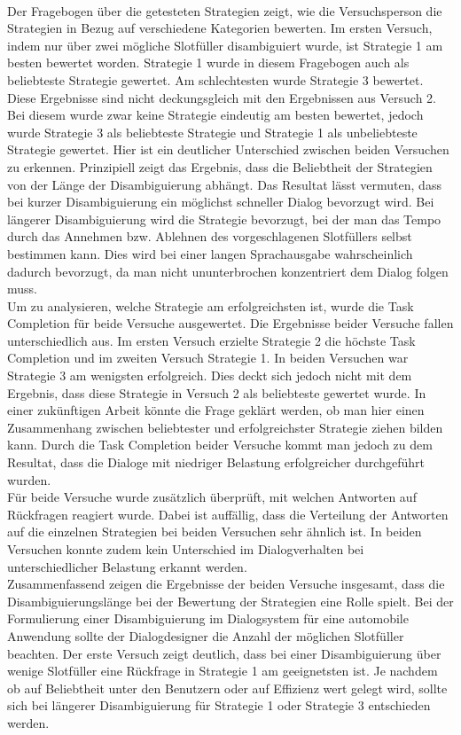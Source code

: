 \documentclass[12pt,a4paper]{scrartcl}
\begin{document}
\\
Der Fragebogen über die getesteten Strategien zeigt, wie die Versuchsperson die Strategien in Bezug auf verschiedene Kategorien bewerten. Im ersten Versuch, indem nur über zwei mögliche Slotfüller disambiguiert wurde, ist Strategie 1 am besten bewertet worden. Strategie 1 wurde in diesem Fragebogen auch als beliebteste Strategie gewertet. Am schlechtesten wurde Strategie 3 bewertet. Diese Ergebnisse sind nicht deckungsgleich mit den Ergebnissen aus Versuch 2. Bei diesem wurde zwar keine Strategie eindeutig am besten bewertet, jedoch wurde Strategie 3 als beliebteste Strategie und Strategie 1 als unbeliebteste Strategie gewertet. Hier ist ein deutlicher Unterschied zwischen beiden Versuchen zu erkennen. Prinzipiell zeigt das Ergebnis, dass die Beliebtheit der Strategien von der Länge der Disambiguierung abhängt. Das Resultat lässt vermuten, dass bei kurzer Disambiguierung ein möglichst schneller Dialog bevorzugt wird. Bei längerer Disambiguierung wird die Strategie bevorzugt, bei der man das Tempo durch das Annehmen bzw. Ablehnen des vorgeschlagenen Slotfüllers selbst bestimmen kann. Dies wird bei einer langen Sprachausgabe wahrscheinlich dadurch bevorzugt, da man nicht ununterbrochen konzentriert dem Dialog folgen muss. \\
\newline
Um zu analysieren, welche Strategie am erfolgreichsten ist, wurde die Task Completion für beide Versuche ausgewertet. Die Ergebnisse beider Versuche fallen unterschiedlich aus. Im ersten Versuch erzielte Strategie 2 die höchste Task Completion und im zweiten Versuch Strategie 1. In beiden Versuchen war Strategie 3 am wenigsten erfolgreich. Dies deckt sich jedoch nicht mit dem Ergebnis, dass diese Strategie in Versuch 2 als beliebteste gewertet wurde. In einer zukünftigen Arbeit könnte die Frage geklärt werden, ob man hier einen Zusammenhang zwischen beliebtester und erfolgreichster Strategie ziehen bilden kann. 
Durch die Task Completion beider Versuche kommt man jedoch zu dem Resultat, dass die Dialoge mit niedriger Belastung erfolgreicher durchgeführt wurden. \\
\newline
Für beide Versuche wurde zusätzlich überprüft, mit welchen Antworten auf Rückfragen reagiert wurde. Dabei ist auffällig, dass die Verteilung der Antworten auf die einzelnen Strategien bei beiden Versuchen sehr ähnlich ist. In beiden Versuchen konnte zudem kein Unterschied im Dialogverhalten bei unterschiedlicher Belastung erkannt werden. \\
\newline
Zusammenfassend zeigen die Ergebnisse der beiden Versuche insgesamt, dass die Disambiguierungslänge bei der Bewertung der Strategien eine Rolle spielt. Bei der Formulierung einer Disambiguierung im Dialogsystem für eine automobile Anwendung sollte der Dialogdesigner die Anzahl der möglichen Slotfüller beachten. Der erste Versuch zeigt deutlich, dass bei einer Disambiguierung über wenige Slotfüller eine Rückfrage in Strategie 1 am geeignetsten ist. Je nachdem ob auf Beliebtheit unter den Benutzern oder auf Effizienz  wert gelegt wird, sollte sich bei längerer Disambiguierung für Strategie 1 oder Strategie 3 entschieden werden. 
\end{document}
